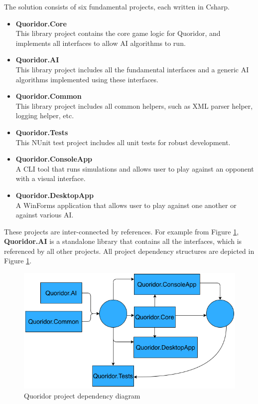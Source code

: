 The solution consists of six fundamental projects, each written in \gls{Csharp}.

\begin{itemize}
    \item \textbf{Quoridor.Core}\\
        This library project contains the core game logic for Quoridor, and implements all interfaces to allow \gls{AI} algorithms to run.
        
    \item \textbf{Quoridor.AI}\\
        This library project includes all the fundamental interfaces and a generic \gls{AI} algorithms implemented using these interfaces.

    \item \textbf{Quoridor.Common}\\
        This library project includes all common helpers, such as XML parser helper, logging helper, etc.

    \item \textbf{Quoridor.Tests}\\
        This NUnit test project includes all unit tests for robust development.

    \item \textbf{Quoridor.ConsoleApp}\\
        A CLI tool that runs simulations and allows user to play against an opponent with a visual interface.

    \item \textbf{Quoridor.DesktopApp}\\
        A WinForms application that allows user to play against one another or against various \gls{AI}.
\end{itemize}

These projects are inter-connected by references. For example from Figure \ref{fig:proj_dep}, \textbf{Quoridor.AI} is a standalone library that contains all the interfaces, which is referenced by all other projects.
All project dependency structures are depicted in Figure \ref{fig:proj_dep}.

\begin{figure}[!ht]
    \centering
    \includegraphics[width=.95\linewidth]{../img/project_structure.png}
    \caption{Quoridor project dependency diagram}
    \label{fig:proj_dep}
\end{figure}